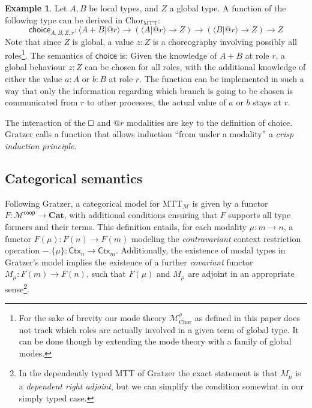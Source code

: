\documentclass{scrartcl}
\theoremstyle{definition}
\newtheorem{example}{Example}
\theoremstyle{plain}
\renewcommand{\square}%
  {\tikz{\draw (0,0) rectangle (0.2cm,0.2cm);}}
\newcommand{\ChorMTT}{Chor${}_{\textrm{MTT}}$}
\begin{document}
\begin{example}
  Let $A, B$ be local types, and $Z$ a global type. A function of the following
  type can be derived in \ChorMTT:
  \[
    \textsf{choice}_{A,B,Z,r} : \langle A + B | @r \rangle
    \to (\langle A | @r \rangle \to Z)
    \to (\langle B | @r \rangle \to Z)
    \to Z
  \]
  Note that since $Z$ is global, a value $z : Z$ is a choreography involving
  possibly all roles\footnote{For the sake of brevity our mode theory
  $\mathcal{M}^{\rho}_{\textrm{Chor}}$ as defined in this paper does not track
  which roles are actually involved in a given term of global type. It can be
  done though by extending the mode theory with a family of global modes.}. The
  semantics of $\textsf{choice}$ is: Given the knowledge of $A + B$ at role
  $r$, a global behaviour $z : Z$ can be chosen for all roles, with the
  additional knowledge of either the value $a : A$ or $b : B$ at role $r$. The
  function can be implemented in such a way that only the information regarding
  which branch is going to be chosen is communicated from $r$ to other
  processes, the actual value of $a$ or $b$ stays at $r$.

  The interaction of the $\square$ and $@r$ modalities are key to the
  definition of choice. Gratzer calls a function that allows induction ``from
  under a modality'' a \emph{crisp induction principle}\cite{gratzer2023syntax}.
\end{example}

\subsection{Categorical semantics}
Following Gratzer, a categorical model for MTT$_{\mathcal{M}}$ is given by a
functor $F : \mathcal{M}^{\textsf{coop}} \to \textbf{Cat}$, with additional
conditions ensuring that $F$ supports all type formers and their terms. This
definition entails, for each modality $\mu : m \to n$, a functor $F(\mu) : F(n)
\to F(m)$ modeling the \emph{contravariant} context restriction operation
${-}.\{\mu\} : \textsf{Ctx}_n \to \textsf{Ctx}_m$. Additionally, the existence
of modal types in Gratzer's model implies the existence of a further
\emph{covariant} functor $M_\mu : F(m) \to F(n)$, such that $F(\mu)$ and
$M_\mu$ are adjoint in an appropriate sense\footnote{In the dependently
  typed MTT of Gratzer the exact statement is that $M_\mu$ is a \emph{dependent
  right adjoint}, but we can simplify the condition somewhat in our simply typed
  case.}.
\end{document}
